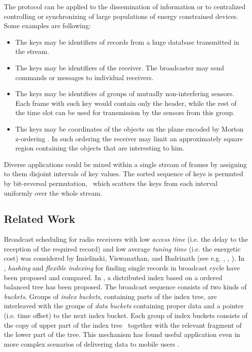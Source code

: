 \documentclass{article}
\newcommand{\tmem}[1]{{\em #1\/}}
\begin{document}
The protocol can be applied to the dissemination of information or to
centralized controlling or synchronizing of large populations of energy
constrained devices. Some examples are following:
\begin{itemize}
  \item The keys may be identifiers of records from a huge database
  transmitted in the stream.
  
  \item The keys may be identifiers of the receiver. The broadcaster may send
  commands or messages to individual receivers.
  
  \item The keys may be identifiers of groups of mutually non-interfering
  sensors. Each frame with such key would contain only the header, while the
  rest of the time slot can be used for transmission by the sensors from this
  group.
  
  \item The keys may be coordinates of the objects on the plane encoded by
  Morton z-ordering {\cite{ZorderMorton}}. In such ordering the receiver may
  limit an approximately square region containing the objects that are
  interesting to him.
  
\end{itemize}
 Diverse applications could be mixed within a single stream of frames
  by assigning to them disjoint intervals of key values. The sorted sequence
  of keys is permuted by bit-reversal permutation, \ which scatters the keys
  from each interval uniformly over the whole stream.


\subsection{ Related Work}

Broadcast scheduling for radio receivers with low {\tmem{access time}} (i.e. the
delay to the reception of the required record) and low average {\tmem{tuning
time}} (i.e. the energetic cost) was considered by Imielinski, Viswanathan, and
Badrinath (see e.g. {\cite{DBLP:conf/sigmod/ImielinskiVB94}},
{\cite{DBLP:conf/edbt/ImielinskiVB94}},
{\cite{DBLP:journals/tkde/ImielinskiVB97}}). In
{\cite{DBLP:conf/edbt/ImielinskiVB94}}, {\tmem{hashing}} and {\tmem{flexible
indexing}} for finding single records in broadcast cycle have been proposed
and compared. In {\cite{DBLP:journals/tkde/ImielinskiVB97}}, a distributed
index based on a ordered balanced tree has been proposed. The broadcast
sequence consists of two kinds of {\tmem{buckets}}. Groups of {\tmem{index
buckets}}, containing parts of the index tree, are interleaved with the groups
of {\tmem{data buckets}} containing proper data and a pointer (i.e. time
offset) to the next index bucket. Each group of index buckets consists of the
copy of upper part of the index tree \ together with the relevant fragment of
the lower part of the tree. This mechanism has found useful application even
in more complex scenarios of delivering data to mobile users
{\cite{DBLP:journals/tods/DattaVCK99}}.
\end{document}
